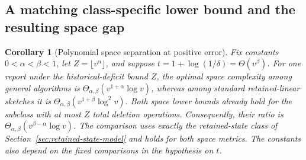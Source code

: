 \documentclass[11pt,letterpaper]{article}
\newtheorem{corollary}[theorem]{Corollary}
\numberwithin{equation}{section}
\begin{document}
\subsection{A matching class-specific lower bound and the resulting space gap}

\begin{corollary}[Polynomial space separation at positive error]
\label{cor:polynomial-linear-gap}
Fix constants $0<\alpha<\beta<1$, let $Z=\lfloor v^\alpha\rfloor$, and suppose $t=1+\log(1/\delta)=\Theta(v^\beta)$.
For one report under the historical-deficit bound $Z$, the optimal space complexity among general algorithms is $\Theta_{\alpha,\beta}(v^{1+\alpha}\log v)$, whereas among standard retained-linear sketches it is $\Theta_{\alpha,\beta}(v^{1+\beta}\log^2v)$.
Both space lower bounds already hold for the subclass with at most $Z$ total deletion operations.
Consequently, their ratio is $\Theta_{\alpha,\beta}(v^{\beta-\alpha}\log v)$.
The comparison uses exactly the retained-state class of Section~\ref{sec:retained-state-model} and holds for both space metrics.
The constants also depend on the fixed comparisons in the hypothesis on $t$.
\end{corollary}
\end{document}
